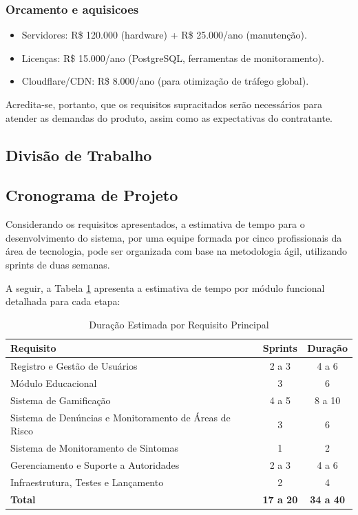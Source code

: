 \documentclass[a4paper, 12pt]{article}
\begin{document}
\subsubsection{Orcamento e aquisicoes}
\begin{itemize}[]
\item Servidores: R\$ 120.000 (hardware) + R\$ 25.000/ano (manutenção).
\item Licenças: R\$ 15.000/ano (PostgreSQL, ferramentas de monitoramento).
\item Cloudflare/CDN: R\$ 8.000/ano (para otimização de tráfego global).
\end{itemize}

Acredita-se, portanto, que os requisitos supracitados serão necessários para atender as demandas do produto, assim como as expectativas do contratante.

\subsection{Divisão de Trabalho}


\subsection{Cronograma de Projeto}

Considerando os requisitos apresentados, a estimativa de tempo para o desenvolvimento do sistema, por uma equipe formada por cinco profissionais da área de tecnologia, pode ser organizada com base na metodologia ágil, utilizando sprints de duas semanas.

A seguir, a Tabela \ref{tab:cronograma}  apresenta a estimativa de tempo por módulo funcional detalhada para cada etapa:

\begin{table}[h]
\centering
\caption{Duração Estimada por Requisito Principal}
\label{tab:cronograma}
\begin{tabular}{|l|c|c|}
\hline
\textbf{Requisito} & \textbf{Sprints} & \textbf{Duração} \\
\hline
Registro e Gestão de Usuários & 2 a 3 & 4 a 6 \\
Módulo Educacional & 3  & 6 \\
Sistema de Gamificação & 4 a 5  & 8 a 10 \\
Sistema de Denúncias e Monitoramento de Áreas de Risco & 3  & 6  \\
Sistema de Monitoramento de Sintomas & 1  & 2  \\
Gerenciamento e Suporte a Autoridades & 2 a 3  & 4 a 6  \\
Infraestrutura, Testes e Lançamento & 2  & 4 \\
\hline
\textbf{Total} & \textbf{17 a 20} & \textbf{34 a 40} \\
\hline
\end{tabular}
\end{table}
\end{document}
